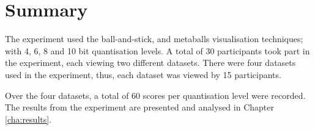 
\section{Summary}
\label{sec:experiment_summary}

The experiment used the ball-and-stick, and metaballs visualisation techniques;
with 4, 6, 8 and 10 bit quantisation levels. A total of 30 participants took
part in the experiment, each viewing two different datasets. There were four
datasets used in the experiment, thus, each dataset was viewed by 15
participants.

Over the four datasets, a total of 60 scores per quantisation level were
recorded. The results from the experiment are presented and analysed in Chapter
\ref{cha:results}.



